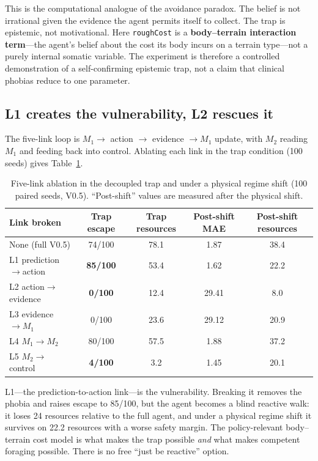 \documentclass{article}
\begin{document}
This is the computational analogue of the avoidance paradox. The belief is not irrational given the evidence the agent permits itself to collect. The trap is epistemic, not motivational. Here \texttt{roughCost} is a \textbf{body--terrain interaction term}---the agent's belief about the cost its body incurs on a terrain type---not a purely internal somatic variable. The experiment is therefore a controlled demonstration of a self-confirming epistemic trap, not a claim that clinical phobias reduce to one parameter.

\subsection{L1 creates the vulnerability, L2 rescues it}

The five-link loop is $M_1\rightarrow$ action $\rightarrow$ evidence $\rightarrow M_1$ update, with $M_2$ reading $M_1$ and feeding back into control. Ablating each link in the trap condition (100 seeds) gives Table~\ref{tab:links}.

\begin{table}[t]
\centering
\small
\caption{Five-link ablation in the decoupled trap and under a physical regime shift (100 paired seeds, V0.5). ``Post-shift'' values are measured after the physical shift.}
\label{tab:links}
\begin{tabular}{lcccc}
\toprule
Link broken & Trap escape & Trap resources & Post-shift MAE & Post-shift resources \\
\midrule
None (full V0.5) & 74/100 & 78.1 & 1.87 & 38.4 \\
L1 prediction$\rightarrow$action & \textbf{85/100} & 53.4 & 1.62 & 22.2 \\
L2 action$\rightarrow$evidence & \textbf{0/100} & 12.4 & 29.41 & 8.0 \\
L3 evidence$\rightarrow M_1$ & 0/100 & 23.6 & 29.12 & 20.9 \\
L4 $M_1\rightarrow M_2$ & 80/100 & 57.5 & 1.88 & 37.2 \\
L5 $M_2\rightarrow$control & \textbf{4/100} & 3.2 & 1.45 & 20.1 \\
\bottomrule
\end{tabular}
\end{table}

L1---the prediction-to-action link---is the vulnerability. Breaking it removes the phobia and raises escape to 85/100, but the agent becomes a blind reactive walk: it loses 24 resources relative to the full agent, and under a physical regime shift it survives on 22.2 resources with a worse safety margin. The policy-relevant body--terrain cost model is what makes the trap possible \emph{and} what makes competent foraging possible. There is no free ``just be reactive'' option.
\end{document}

